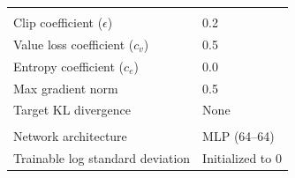 \documentclass[11pt]{article}
\begin{document}
\begin{table}[htbp]
{\begin{tabular}{ll}
\hline \\
Clip coefficient ($\epsilon$) & 0.2 \\
Value loss coefficient ($c_v$) & 0.5 \\
Entropy coefficient ($c_e$) & 0.0 \\
Max gradient norm & 0.5 \\
Target KL divergence & None \\
\hline \\
Network architecture & MLP (64–64) \\
Trainable log standard deviation & Initialized to 0 \\
\end{tabular}
}
\end{table}
\end{document}
